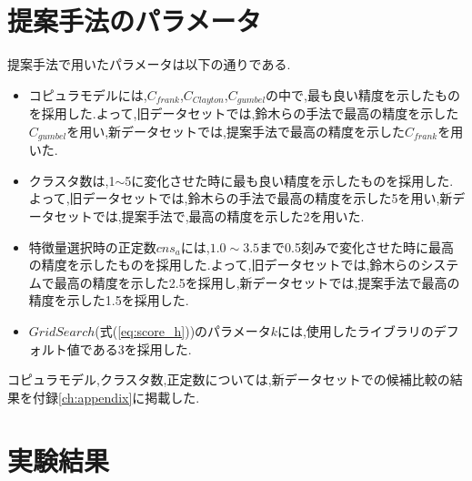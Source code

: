\section{提案手法のパラメータ}
提案手法で用いたパラメータは以下の通りである.
\begin{itemize}
  \item コピュラモデルには,$C_{frank}$,$C_{Clayton}$,$C_{gumbel}$の中で,最も良い精度を示したものを採用した.よって,旧データセットでは,鈴木らの手法で最高の精度を示した$C_{gumbel}$を用い,新データセットでは,提案手法で最高の精度を示した$C_{frank}$を用いた.
\item クラスタ数は,1$\sim$5に変化させた時に最も良い精度を示したものを採用した.よって,旧データセットでは,鈴木らの手法で最高の精度を示した5を用い,新データセットでは,提案手法で,最高の精度を示した2を用いた.
\item 特徴量選択時の正定数$cns_a$には,$1.0\sim3.5$まで0.5刻みで変化させた時に最高の精度を示したものを採用した.よって,旧データセットでは,鈴木らのシステムで最高の精度を示した2.5を採用し,新データセットでは,提案手法で最高の精度を示した1.5を採用した.
\item $GridSearch$(式(\ref{eq:score_h}))のパラメータ$k$には,使用したライブラリのデフォルト値である3を採用した.
\end{itemize}
コピュラモデル,クラスタ数,正定数については,新データセットでの候補比較の結果を付録\ref{ch:appendix}に掲載した.
\section{実験結果}
